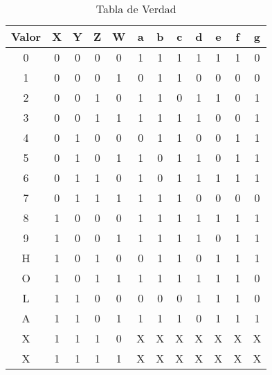   \begin{table}[H]
    \begin{center}
      \begin{tabular}{ c ||| c  c  c  c ||| c | c | c | c | c | c | c}
        \toprule
        Valor & X & Y & Z & W & a & b & c & d & e & f & g \\
        \toprule
        0    &    0 & 0 & 0 & 0    &    1 & 1 & 1 & 1 & 1 & 1 & 0 \\
        1    &    0 & 0 & 0 & 1    &    0 & 1 & 1 & 0 & 0 & 0 & 0 \\
        2    &    0 & 0 & 1 & 0    &    1 & 1 & 0 & 1 & 1 & 0 & 1 \\
        3    &    0 & 0 & 1 & 1    &    1 & 1 & 1 & 1 & 0 & 0 & 1 \\
        \midrule
        4    &    0 & 1 & 0 & 0    &    0 & 1 & 1 & 0 & 0 & 1 & 1 \\
        5    &    0 & 1 & 0 & 1    &    1 & 0 & 1 & 1 & 0 & 1 & 1 \\
        6    &    0 & 1 & 1 & 0    &    1 & 0 & 1 & 1 & 1 & 1 & 1 \\
        7    &    0 & 1 & 1 & 1    &    1 & 1 & 1 & 0 & 0 & 0 & 0 \\
        \midrule
        8    &    1 & 0 & 0 & 0    &    1 & 1 & 1 & 1 & 1 & 1 & 1 \\
        9    &    1 & 0 & 0 & 1    &    1 & 1 & 1 & 1 & 0 & 1 & 1 \\
        H    &    1 & 0 & 1 & 0    &    0 & 1 & 1 & 0 & 1 & 1 & 1 \\
        O    &    1 & 0 & 1 & 1    &    1 & 1 & 1 & 1 & 1 & 1 & 0 \\
        \midrule
        L    &    1 & 1 & 0 & 0    &    0 & 0 & 0 & 1 & 1 & 1 & 0 \\
        A    &    1 & 1 & 0 & 1    &    1 & 1 & 1 & 0 & 1 & 1 & 1 \\
        X    &    1 & 1 & 1 & 0    &    X & X & X & X & X & X & X \\
        X    &    1 & 1 & 1 & 1    &    X & X & X & X & X & X & X \\
        \bottomrule
      \end{tabular}
      \label{tab:verdad}
      \caption{Tabla de Verdad}
    \end{center}
  \end{table}


